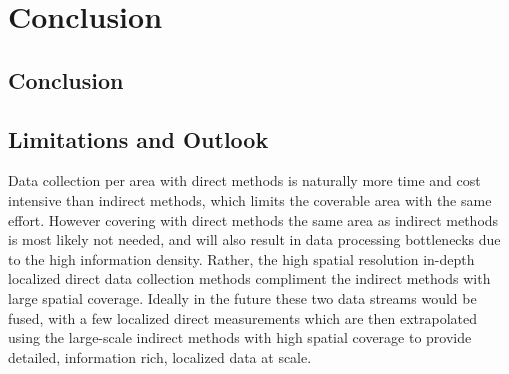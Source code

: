 \chapter{Conclusion}
\label{ch:conclusion}

\section{Conclusion}


\section{Limitations and Outlook} %

Data collection per area with direct methods is naturally more time and cost intensive than indirect methods, which limits the coverable area with the same effort. 
However covering with direct methods the same area as indirect methods is most likely not needed, and will also result in data processing bottlenecks due to the  high information density. Rather, the high spatial resolution in-depth localized direct data collection methods compliment the indirect methods with large spatial coverage.  Ideally in the future these two data streams would be fused, with a few localized direct measurements which are then extrapolated using the large-scale indirect methods with high spatial coverage to provide detailed, information rich, localized data at scale.
